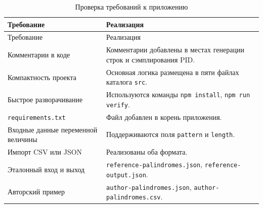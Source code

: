 \noindent
\begingroup
\centering
\small
\begin{longtable}[c]{|p{6cm}|p{9cm}|}
    \caption{Проверка требований к приложению}
    \label{tab:software-requirements}
    \\
    \hline
    Требование & Реализация \\ \hline
    \endfirsthead
    \hline
    Требование & Реализация \\ \hline
    \endhead
    \hline
    Комментарии в коде & Комментарии добавлены в местах генерации строк и сэмплирования PID. \\ \hline
    Компактность проекта & Основная логика размещена в пяти файлах каталога \texttt{src}. \\ \hline
    Быстрое разворачивание & Используются команды \texttt{npm install}, \texttt{npm run verify}. \\ \hline
    \texttt{requirements.txt} & Файл добавлен в корень приложения. \\ \hline
    Входные данные переменной величины & Поддерживаются поля \texttt{pattern} и \texttt{length}. \\ \hline
    Импорт CSV или JSON & Реализованы оба формата. \\ \hline
    Эталонный вход и выход & \texttt{reference-palindromes.json}, \texttt{reference-output.json}. \\ \hline
    Авторский пример & \texttt{author-palindromes.json}, \texttt{author-palindromes.csv}. \\ \hline
\end{longtable}
\normalsize
\endgroup
